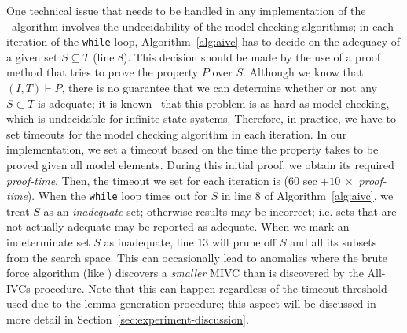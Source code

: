 One technical issue that needs to
be handled in any implementation of the \aivcalg ~algorithm involves the undecidability of the model checking algorithms;
in each iteration of the \texttt{while} loop, Algorithm~\ref{alg:aivc}
has to decide on the adequacy of a given set $S \subseteq T$ (line 8).
This decision should be made by the use of a proof method that
tries to prove the property $P$ over $S$. Although we know that $(I, T) \vdash P$,
there is no guarantee that we can determine whether or not any $S \subset T$ is adequate; it is known~\cite{Ghass16} that
this problem is as hard as model checking, which is undecidable for infinite state systems.
Therefore, in practice, we have to set timeouts for the model checking algorithm in each iteration.
In our implementation, we set a timeout based on the time the property takes to be proved given all model elements.
During this initial proof, we obtain its required \emph{proof-time}.
Then, the timeout we set for each iteration is ($60$ sec  $+ 10\ \times$ \emph{proof-time}).
When the \texttt{while} loop times out for $S$ in line 8 of Algorithm~\ref{alg:aivc},
we treat $S$ as an \emph{inadequate} set;
otherwise results may be incorrect; i.e. sets that are not actually adequate may be reported as adequate.
When we mark an indeterminate set $S$ as inadequate, line 13 will prune off $S$ and all its subsets from
the search space.  This can occasionally lead to anomalies where the brute force algorithm (like \ucbfalg) discovers a {\em smaller}
MIVC than is discovered by the All-IVCs procedure.  Note that this can happen regardless of the timeout threshold used
due to the lemma generation procedure; this aspect will be discussed in more detail in
Section~\ref{sec:experiment-discussion}.


%

